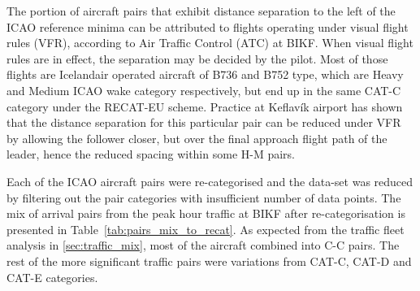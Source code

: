 The portion of aircraft pairs that exhibit distance separation to the left of the ICAO reference minima can be attributed to flights operating under visual flight rules (VFR), according to Air Traffic Control (ATC) at BIKF. When visual flight rules are in effect, the separation may be decided by the pilot. Most of those flights are Icelandair operated aircraft of B736 and B752 type, which are Heavy and Medium ICAO wake category respectively, but end up in the same CAT-C category under the  RECAT-EU scheme. Practice at Keflavík airport has shown that the distance separation for this particular pair can be reduced under VFR by allowing the follower closer, but over the final approach flight path of the leader, hence the reduced spacing within some H-M pairs.

Each of the ICAO aircraft pairs were re-categorised and the data-set was reduced by filtering out the pair categories with insufficient number of data points. The mix of arrival pairs from the peak hour traffic at BIKF after re-categorisation is presented in Table~\ref{tab:pairs_mix_to_recat}. As expected from the traffic fleet analysis in \ref{sec:traffic_mix}, most of the aircraft combined into C-C pairs. The rest of the more significant traffic pairs were variations from CAT-C, CAT-D and CAT-E categories.

